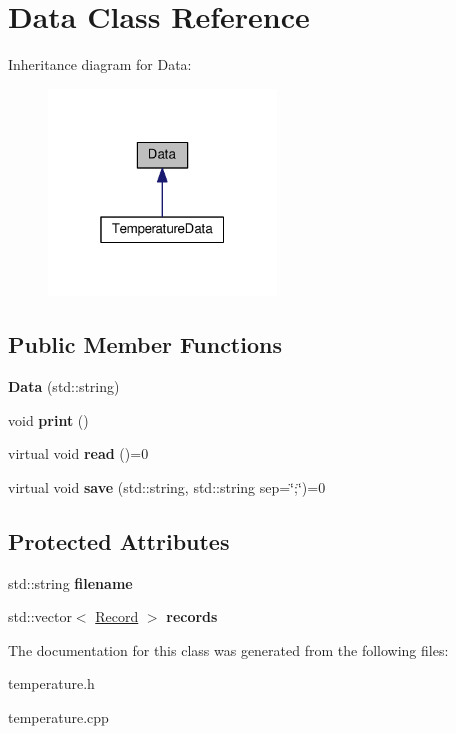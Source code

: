 \hypertarget{classData}{}\section{Data Class Reference}
\label{classData}


Inheritance diagram for Data\+:\nopagebreak
\begin{figure}[H]
\begin{center}
\leavevmode
\includegraphics[width=172pt]{classData__inherit__graph}
\end{center}
\end{figure}
\subsection*{Public Member Functions}
\begin{DoxyCompactItemize}
\item 
{\bfseries Data} (std\+::string)\hypertarget{classData_a619cb123144821ee3cc9082a5e5e468d}{}\label{classData_a619cb123144821ee3cc9082a5e5e468d}

\item 
void {\bfseries print} ()\hypertarget{classData_a779ce878d01483220b49ad9e513d7366}{}\label{classData_a779ce878d01483220b49ad9e513d7366}

\item 
virtual void {\bfseries read} ()=0\hypertarget{classData_a16a784e96cd5e92785a0c4f2824284c7}{}\label{classData_a16a784e96cd5e92785a0c4f2824284c7}

\item 
virtual void {\bfseries save} (std\+::string, std\+::string sep=\char`\"{};\char`\"{})=0\hypertarget{classData_abfbd034f17ac92ce1fbad5f148abb80c}{}\label{classData_abfbd034f17ac92ce1fbad5f148abb80c}

\end{DoxyCompactItemize}
\subsection*{Protected Attributes}
\begin{DoxyCompactItemize}
\item 
std\+::string {\bfseries filename}\hypertarget{classData_a2cbdf542620c5f62b3e504ea2cecffd0}{}\label{classData_a2cbdf542620c5f62b3e504ea2cecffd0}

\item 
std\+::vector$<$ \hyperlink{structRecord}{Record} $>$ {\bfseries records}\hypertarget{classData_ab886b83cfa461cc7def5c0e8ba870d7c}{}\label{classData_ab886b83cfa461cc7def5c0e8ba870d7c}

\end{DoxyCompactItemize}


The documentation for this class was generated from the following files\+:\begin{DoxyCompactItemize}
\item 
temperature.\+h\item 
temperature.\+cpp\end{DoxyCompactItemize}
